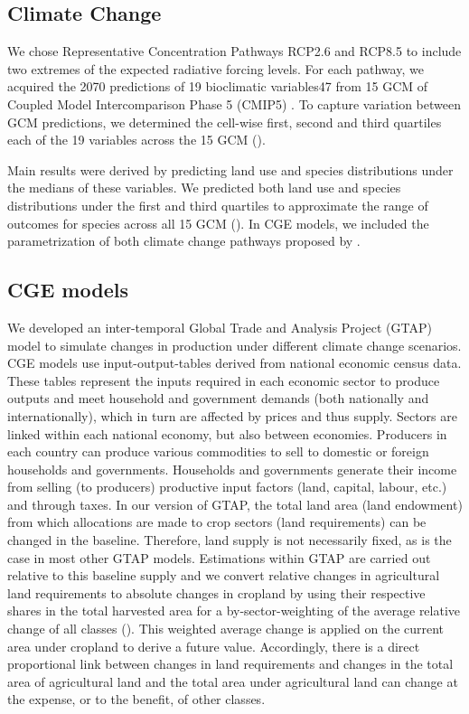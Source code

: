 \subsection{Climate Change} 
We chose Representative Concentration Pathways RCP2.6 and RCP8.5 \citep{van_vuuren_representative_2011} to include two extremes of the expected radiative forcing levels. For each pathway, we acquired the 2070 predictions of 19 bioclimatic variables47 from 15 GCM of Coupled Model Intercomparison Phase 5 (CMIP5) \citep{taylor_overview_2012}. To capture variation between GCM predictions, we determined the cell-wise first, second and third quartiles each of the 19 variables across the 15 GCM ().

Main results were derived by predicting land use and species distributions under the medians of these variables. We predicted both land use and species distributions under the first and third quartiles to approximate the range of outcomes for species across all 15 GCM (). In CGE models, we included the parametrization of both climate change pathways proposed by \citet{roson_estimation_2016}.

\subsection{CGE models} 
We developed an inter-temporal Global Trade and Analysis Project (GTAP) model \citep{hertel_global_1997} to simulate changes in production under different climate change scenarios. CGE models use input-output-tables derived from national economic census data. These tables represent the inputs required in each economic sector to produce outputs and meet household and government demands (both nationally and internationally), which in turn are affected by prices and thus supply. Sectors are linked within each national economy, but also between economies. Producers in each country can produce various commodities to sell to domestic or foreign households and governments. Households and governments generate their income from selling (to producers) productive input factors (land, capital, labour, etc.) and through taxes. In our version of GTAP, the total land area (land endowment) from which allocations are made to crop sectors (land requirements) can be changed in the baseline. Therefore, land supply is not necessarily fixed, as is the case in most other GTAP models.  
Estimations within GTAP are carried out relative to this baseline supply and we convert relative changes in agricultural land requirements to absolute changes in cropland by using their respective shares in the total harvested area for a by-sector-weighting of the average relative change of all classes (). This weighted average change is applied on the current area under cropland to derive a future value. Accordingly, there is a direct proportional link between changes in land requirements and changes in the total area of agricultural land and the total area under agricultural land can change at the expense, or to the benefit, of other classes. 

